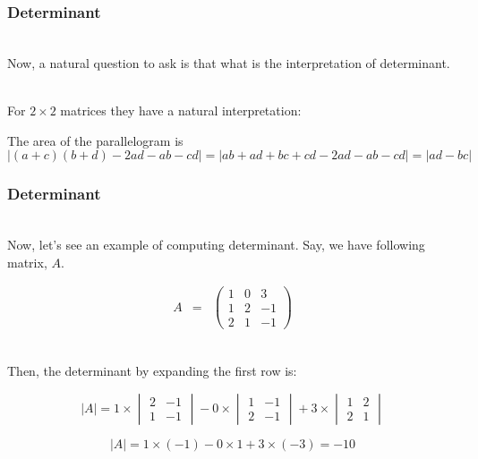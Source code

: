 \documentclass{beamer}
\numberwithin{equation}{section}
\begin{document}
\begin{frame}
\frametitle{Determinant}

\ \\Now, a natural question to ask is that what is the interpretation of determinant. \pause

\ \\For $2\times 2$ matrices they have a natural interpretation: \pause

\begin{center}
\end{center}

The area of the parallelogram is $$|(a+c)(b+d)-2ad-ab-cd|=|ab+ad+bc+cd-2ad-ab-cd|=|ad-bc|$$

\end{frame}



\begin{frame}
\frametitle{Determinant}

\ \\Now, let's see an example of computing determinant. Say, we have following matrix, $A$. \pause

\begin{eqnarray}
A & = & \begin{pmatrix}
1 & 0 & 3 \\
1 & 2 & -1 \\
2 & 1 & -1
\end{pmatrix} \nonumber
\end{eqnarray} \pause

\ \\Then, the determinant by expanding the first row is:

$$ |A| = 1 \times 
\begin{vmatrix}
2 & -1 \\
1 & -1
\end{vmatrix} - 0 \times
\begin{vmatrix}
1 & -1 \\
2 & -1
\end{vmatrix} + 3 \times
\begin{vmatrix}
1 & 2 \\
2 & 1
\end{vmatrix} $$ \pause

$$ |A| = 1 \times (-1) - 0 \times 1 + 3 \times (-3) = -10$$

\end{frame}



\end{document}
